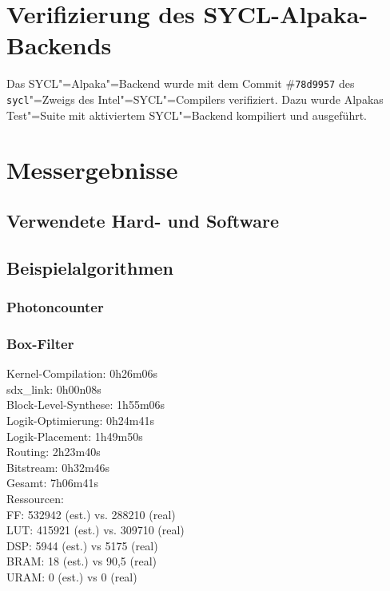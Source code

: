 \section{Verifizierung des SYCL-Alpaka-Backends}
\label{ergebnisse:verifizierung}

Das SYCL"=Alpaka"=Backend wurde mit dem Commit \#\texttt{78d9957} des
\texttt{sycl}"=Zweigs des Intel"=SYCL"=Compilers verifiziert. Dazu wurde
Alpakas Test"=Suite mit aktiviertem SYCL"=Backend kompiliert und ausgeführt.

\section{Messergebnisse}
\label{ergebnisse:messergebnisse}

\subsection{Verwendete Hard- und Software}
\label{ergebnisse:messergebnisse:stack}

\subsection{Beispielalgorithmen}
\label{ergebnisse:messergebnisse:algorithmus}

\subsubsection{Photoncounter}
\cite{benner2018}

\subsubsection{Box-Filter}

Kernel-Compilation:     0h26m06s\\
sdx\_link:              0h00n08s\\
Block-Level-Synthese:   1h55m06s\\
Logik-Optimierung:      0h24m41s\\
Logik-Placement:        1h49m50s\\
Routing:                2h23m40s\\
Bitstream:              0h32m46s\\
Gesamt:                 7h06m41s\\

Ressourcen:\\ 
FF: 532942 (est.) vs. 288210 (real)\\
LUT: 415921 (est.) vs. 309710 (real)\\
DSP: 5944 (est.) vs 5175 (real)\\
BRAM: 18 (est.) vs 90,5 (real)\\
URAM: 0 (est.) vs 0 (real)


